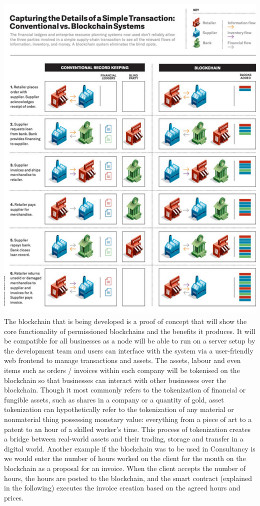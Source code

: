 \includegraphics[width=\linewidth]{figures/vs.png} \\

The blockchain that is being developed is a proof of concept that will show the core functionality of permissioned blockchains and the benefits it produces. It will be compatible for all businesses as a node will be able to run on a server setup by the development team and users can interface with the system via a user-friendly web frontend to manage transactions and assets. The assets, labour and even items such as orders / invoices within each company will be tokenised on the blockchain so that businesses can interact with other businesses over the blockchain. Though it most commonly refers to the tokenization of financial or fungible assets, such as shares in a company or a quantity of gold, asset tokenization can hypothetically refer to the tokenization of any material or nonmaterial thing possessing monetary value: everything from a piece of art to a patent to an hour of a skilled worker’s time. This process of tokenization creates a bridge between real-world assets and their trading, storage and transfer in a digital world. Another example if the blockchain was to be used in Consultancy is we would enter the number of hours worked on the client for the month on the blockchain as a proposal for an invoice. When the client accepts the number of hours, the hours are posted to the blockchain, and the smart contract (explained in the following) executes the invoice creation based on the agreed hours and prices. \\

